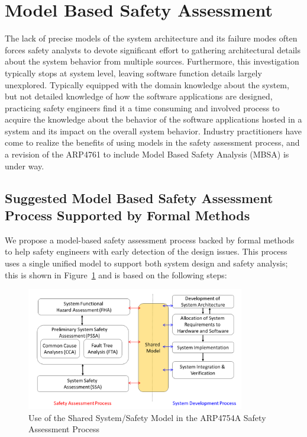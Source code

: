 \section{Model Based Safety Assessment}
\label{sec:mbsa}

The lack of precise models of the system architecture and its failure modes often forces safety analysts to devote significant effort to gathering architectural details about the system behavior from multiple sources. Furthermore, this investigation typically stops at system level, leaving software function details largely unexplored. Typically equipped with the domain knowledge about the system, but not detailed knowledge of how the software applications are designed, practicing safety engineers find it a time consuming and involved process to acquire the knowledge about the behavior of the software applications hosted in a system and its impact on the overall system behavior.
Industry practitioners have come to realize the benefits of using models in the safety assessment process, and a revision of the ARP4761 to include Model Based Safety Analysis (MBSA) is under way. 

\subsection{Suggested Model Based Safety Assessment Process Supported by Formal Methods}
We propose a model-based safety assessment process backed by formal methods to help safety engineers with early detection of the design issues.  This process uses a single unified model to support both system design and safety analysis; this is shown in Figure~\ref{fig:proposed_safety_process} and is based on the following steps:

\begin{figure}[t!]
	\centering
	\includegraphics[trim=0 5 0 5,clip,width=0.85\textwidth]{images/process3.png}
	\caption{Use of the Shared System/Safety Model in the ARP4754A Safety Assessment Process}
	\label{fig:proposed_safety_process}
\end{figure}

